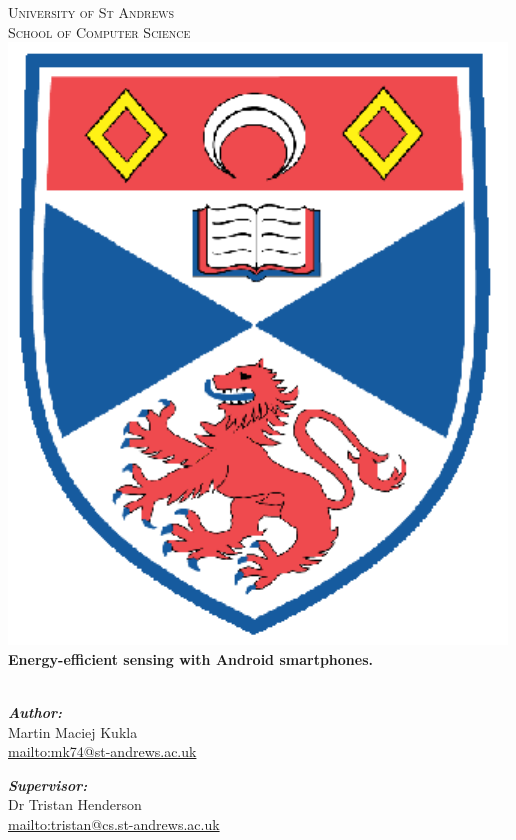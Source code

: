 \begin{titlepage}

\begin{center}

\vfill

\textsc{\Large University of St Andrews \\ School of Computer Science}\\[1.5cm]


\includegraphics[scale=0.5]{crest}
\vfill
\HRule \\[0.4cm]
{\bfseries \huge Energy-efficient sensing with Android smartphones.}\\[0.4cm]

\HRule \\[1.5cm]



\begin{minipage}{0.4\textwidth}
\begin{flushleft} \large
\emph{\textbf{Author:}} \\
Martin Maciej Kukla\\
\small \url{mailto:mk74@st-andrews.ac.uk}\\
\end{flushleft}
\end{minipage}
\begin{minipage}{0.4\textwidth}
\begin{flushright} \large
\emph{\textbf{Supervisor:}} \\
Dr Tristan Henderson\\
\small \url{mailto:tristan@cs.st-andrews.ac.uk}\\


\end{flushright}
\end{minipage}
\end{center}
\end{titlepage}
